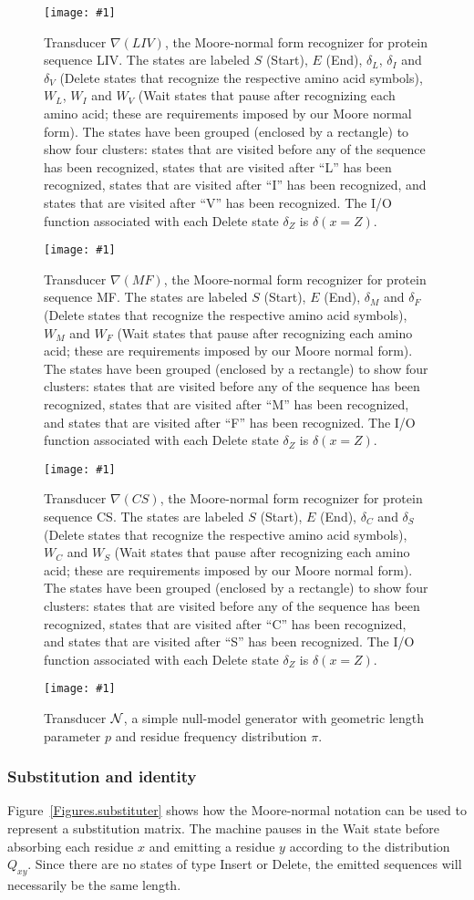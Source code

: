 \documentclass{article}
\newcommand{\figref}[1]{Figure~\ref{Figures.#1}}
\newcommand{\figlabel}[1]{\label{Figures.#1}}
\newcommand{\easyfig}[4]{
\begin{figure}
\texttt{[image: \#1]}
\caption{ \figlabel{#3} #4}
\end{figure}}
\newcommand{\pdffig}[2]{\easyfig{#1-fig.pdf}{}{#1}{#2}}
\newcommand{\tallpdffig}[2]{\easyfig{#1-fig.pdf}{height=.8\textheight}{#1}{#2}}
\newcommand\nullmodel{{\cal N}}
\newcommand\recognize{\nabla}
\begin{document}
\tallpdffig{liv-labeled}{Transducer $\recognize(LIV)$, the Moore-normal form recognizer for protein sequence LIV.
The states are labeled $S$ (Start), $E$ (End),
$\delta_L$, $\delta_I$ and $\delta_V$ (Delete states that recognize the respective amino acid symbols),
$W_L$, $W_I$ and $W_V$ (Wait states that pause after recognizing each amino acid;
these are requirements imposed by our Moore normal form).
The states have been grouped (enclosed by a rectangle) to show four clusters:
 states that are visited before any of the sequence has been recognized,
 states that are visited after ``L'' has been recognized,
 states that are visited after ``I'' has been recognized,
and
 states that are visited after ``V'' has been recognized.
The I/O function associated with each Delete state $\delta_Z$ is $\delta(x=Z)$.}
\pdffig{mf-labeled}{Transducer $\recognize(MF)$, the Moore-normal form recognizer for protein sequence MF.
The states are labeled $S$ (Start), $E$ (End),
$\delta_M$ and $\delta_F$ (Delete states that recognize the respective amino acid symbols),
$W_M$ and $W_F$ (Wait states that pause after recognizing each amino acid;
these are requirements imposed by our Moore normal form).
The states have been grouped (enclosed by a rectangle) to show four clusters:
 states that are visited before any of the sequence has been recognized,
 states that are visited after ``M'' has been recognized,
and
 states that are visited after ``F'' has been recognized.
The I/O function associated with each Delete state $\delta_Z$ is $\delta(x=Z)$.}
\pdffig{cs-labeled}{Transducer $\recognize(CS)$, the Moore-normal form recognizer for protein sequence CS.
The states are labeled $S$ (Start), $E$ (End),
$\delta_C$ and $\delta_S$ (Delete states that recognize the respective amino acid symbols),
$W_C$ and $W_S$ (Wait states that pause after recognizing each amino acid;
these are requirements imposed by our Moore normal form).
The states have been grouped (enclosed by a rectangle) to show four clusters:
 states that are visited before any of the sequence has been recognized,
 states that are visited after ``C'' has been recognized,
and
 states that are visited after ``S'' has been recognized.
The I/O function associated with each Delete state $\delta_Z$ is $\delta(x=Z)$.}
\pdffig{null-model}{Transducer $\nullmodel$, a simple null-model generator with geometric length parameter $p$ and residue frequency distribution $\pi$.}

\subsubsection{Substitution and identity}
\figref{substituter} shows how the Moore-normal notation can be  used to represent a substitution matrix.  
The machine pauses in the Wait state before absorbing each residue $x$ and emitting a residue $y$
according to the distribution $Q_{xy}$.  
Since there are no states of type Insert or Delete, the emitted sequences will necessarily
be the same length.  
\end{document}
